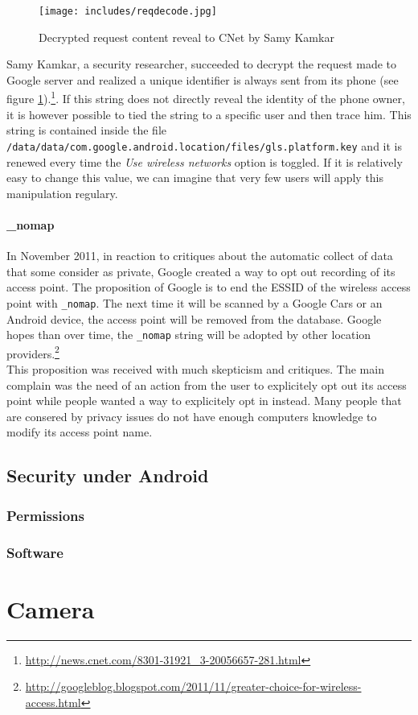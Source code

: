 \documentclass{report}
\begin{document}
\begin{figure}[h]
  \hspace*{-1cm}
  \centering
  \texttt{[image: includes/reqdecode.jpg]}
  \caption{Decrypted request content reveal to CNet by Samy Kamkar}
  \label{fig:reqdecode}
\end{figure}

Samy Kamkar, a security researcher, succeeded to decrypt the request made to Google server and realized a unique identifier is always sent from its phone (see figure \ref{fig:reqdecode}).\footnote{\url{http://news.cnet.com/8301-31921_3-20056657-281.html}}. If this string does not directly reveal the identity of the phone owner, it is however possible to tied the string to a specific user and then trace him. This string is contained inside the file \texttt{/data/data/com.google.android.location/files/gls.platform.key} and it is renewed every time the \emph{Use wireless networks} option is toggled. If it is relatively easy to change this value, we can imagine that very few users will apply this manipulation regulary.

\subsection{\_nomap}

In November 2011, in reaction to critiques about the automatic collect of data that some consider as private, Google created a way to opt out recording of its access point. The proposition of Google is to end the ESSID of the wireless access point with \texttt{\_nomap}. The next time it will be scanned by a Google Cars or an Android device, the access point will be removed from the database. Google hopes than over time, the \texttt{\_nomap} string will be adopted by other location providers.\footnote{\url{http://googleblog.blogspot.com/2011/11/greater-choice-for-wireless-access.html}}\\

This proposition was received with much skepticism and critiques. The main complain was the need of an action from the user to explicitely opt out its access point while people wanted a way to explicitely opt in instead. Many people that are consered by privacy issues do not have enough computers knowledge to modify its access point name.

\chapter{Security under Android}
\section{Permissions}

\section{Software}

\part{Camera}

\tableofcontents
\end{document}
